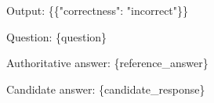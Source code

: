 \documentclass{article}
\theoremstyle{plain}
\theoremstyle{definition}
\theoremstyle{remark}
\begin{document}
{\begin{minipage}{0.94\textwidth}
\hspace*{2em}Output: \{\{"correctness": "incorrect"\}\}\par
\vspace{0.55em}
Question:\newline
\textasciigrave{}\textasciigrave{}\textasciigrave{}\newline
\{question\}\newline
\textasciigrave{}\textasciigrave{}\textasciigrave{}\par
\vspace{0.55em}
Authoritative answer:\newline
\textasciigrave{}\textasciigrave{}\textasciigrave{}\newline
\{reference\_answer\}\newline
\textasciigrave{}\textasciigrave{}\textasciigrave{}\par
\vspace{0.55em}
Candidate answer:\newline
\textasciigrave{}\textasciigrave{}\textasciigrave{}\newline
\{candidate\_response\}\newline
\textasciigrave{}\textasciigrave{}\textasciigrave{}\par
\end{minipage}%
}
\endgroup

\clearpage
\end{document}
